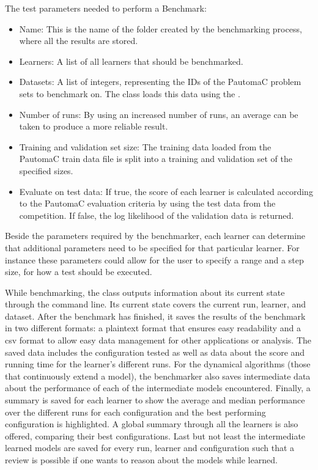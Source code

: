 The test parameters needed to perform a Benchmark:

\begin{itemize}
	\item[] Name: This is the name of the folder created by the benchmarking process, where all the results are stored.
	\item[] Learners: A list of all learners that should be benchmarked.
	\item[] Datasets: A list of integers, representing the IDs of the PautomaC problem sets to benchmark on. The  class loads this data using the .
	\item[] Number of runs: By using an increased number of runs, an average can be taken to produce a more reliable result.
	\item[] Training and validation set size: The training data loaded from the PautomaC train data file is split into a training and validation set of the specified sizes.
	\item[] Evaluate on test data: If true, the score of each learner is calculated according to the PautomaC evaluation criteria by using the test data from the competition. If false, the log likelihood of the validation data is returned.
\end{itemize}

Beside the parameters required by the benchmarker, each learner can determine that additional parameters need to be specified for that particular learner. For instance these parameters could allow for the user to specify a range and a step size, for how a test should be executed.

While benchmarking, the  class outputs information about its current state through the command line. Its current state covers the current run, learner, and dataset. After the benchmark has finished, it saves the results of the benchmark in two different formats: a plaintext format that ensures easy readability and a \gls{csv} format to allow easy data management for other applications or analysis. The saved data includes the configuration tested as well as data about the score and running time for the learner's different runs. For the dynamical algorithms (those that continuously extend a model), the benchmarker also saves intermediate data about the performance of each of the intermediate models encountered. 
Finally, a summary is saved for each learner to show the average and median performance over the different runs for each configuration and the best performing configuration is highlighted. A global summary through all the learners is also offered, comparing their best configurations. Last but not least the intermediate learned models are saved for every run, learner and configuration such that a review is possible if one wants to reason about the models while learned.


